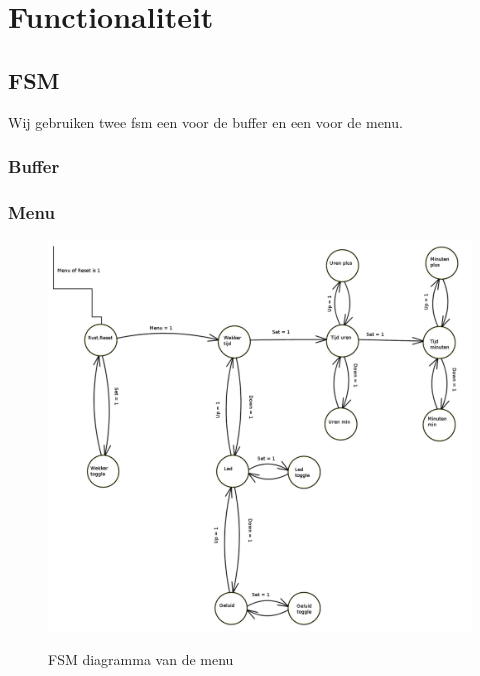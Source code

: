 \section{Functionaliteit}

\subsection{FSM}
Wij gebruiken twee fsm een voor de buffer en een voor de menu.
\subsubsection{Buffer}


\subsubsection{Menu}
\begin{figure}[ht!]
\includegraphics[width=\textwidth,height=\textheight,keepaspectratio]{FSM/controller_fsm.png}
\label{fig:FSM_controller}
\caption{FSM diagramma van de menu}
\end{figure}
